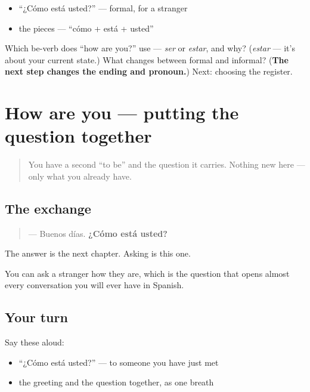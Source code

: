 \begin{itemize}
\raggedright
  \item \textquotedblleft{}¿Cómo está usted?\textquotedblright{} — formal, for a stranger
  \item the pieces — \textquotedblleft{}cómo + está + usted\textquotedblright{}
\end{itemize}

\begin{tcolorbox}[breakable,colback=teal!4,colframe=teal!35!black,title={Before you move on}]
Which be-verb does \textquotedblleft{}how are you?\textquotedblright{} use — \emph{ser} or \emph{estar}, and why? (\emph{estar} — it's about your current state.) What changes between formal and informal? (\textbf{The next step changes the ending and pronoun.}) Next: choosing the register.
\end{tcolorbox}
\section[Practice]{How are you — putting the question together}

\label{lesson:ES-C04-repaso-como-esta}



\begin{quote}
You have a second \textquotedblleft{}to be\textquotedblright{} and the question it carries. Nothing new here — only what you already have.
\end{quote}

\subsection*{The exchange}
\begin{quote}
— Buenos días. \textbf{¿Cómo está usted?}
\end{quote}

The answer is the next chapter. Asking is this one.

\begin{grammarlens}[title={What you've built}]
You can ask a stranger how they are, which is the question that opens almost every conversation you will ever have in Spanish.
\end{grammarlens}

\subsection*{Your turn}
Say these aloud:

\begin{itemize}
\raggedright
  \item \textquotedblleft{}¿Cómo está usted?\textquotedblright{} — to someone you have just met
  \item the greeting and the question together, as one breath
\end{itemize}

